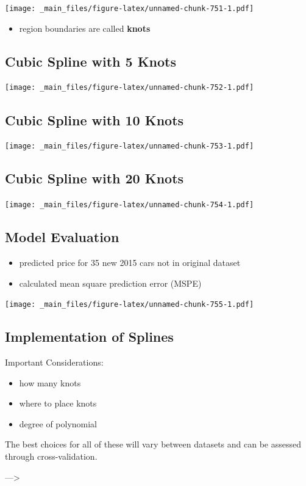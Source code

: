 \documentclass[]{book}
\providecommand{\tightlist}{%
  \setlength{\itemsep}{0pt}\setlength{\parskip}{0pt}}
\begin{document}
\texttt{[image: \_main\_files/figure-latex/unnamed-chunk-751-1.pdf]}

\begin{itemize}
\tightlist
\item
  region boundaries are called \textbf{knots}
\end{itemize}

\subsection{Cubic Spline with 5 Knots}\label{cubic-spline-with-5-knots}

\texttt{[image: \_main\_files/figure-latex/unnamed-chunk-752-1.pdf]}

\subsection{Cubic Spline with 10
Knots}\label{cubic-spline-with-10-knots}

\texttt{[image: \_main\_files/figure-latex/unnamed-chunk-753-1.pdf]}

\subsection{Cubic Spline with 20
Knots}\label{cubic-spline-with-20-knots}

\texttt{[image: \_main\_files/figure-latex/unnamed-chunk-754-1.pdf]}

\subsection{Model Evaluation}\label{model-evaluation}

\begin{itemize}
\tightlist
\item
  predicted price for 35 new 2015 cars not in original dataset\\
\item
  calculated mean square prediction error (MSPE)
\end{itemize}

\texttt{[image: \_main\_files/figure-latex/unnamed-chunk-755-1.pdf]}

\subsection{Implementation of Splines}\label{implementation-of-splines}

Important Considerations:

\begin{itemize}
\tightlist
\item
  how many knots\\
\item
  where to place knots\\
\item
  degree of polynomial
\end{itemize}

The best choices for all of these will vary between datasets and can be
assessed through cross-validation.

---\textgreater{}


\end{document}
